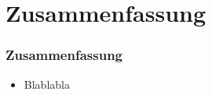 \section{Zusammenfassung}

\begin{frame}
	\frametitle{Zusammenfassung}
	\begin{itemize}
		\item Blablabla
	\end{itemize}
\end{frame}
